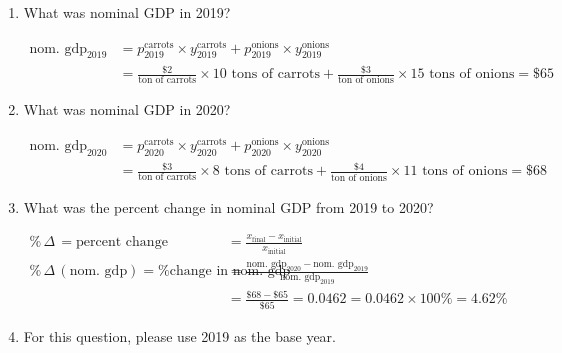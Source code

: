 \documentclass{assignment}
\begin{document}
\begin{enumerate}

\item What was nominal GDP in 2019?

\begin{solution}
\vspace{-1.0\baselineskip}
\begin{align*}
\text{nom.~gdp}_{\text{2019}} &= 
p^{\text{carrots}}_{\text{2019}} \times y^{\text{carrots}}_{\text{2019}} +
p^{\text{onions}}_{\text{2019}} \times y^{\text{onions}}_{\text{2019}} \\
 &= \frac{\$2}{\text{ton of carrots}} \times 10 \text{ tons of carrots} + \frac{\$3}{\text{ton of onions}} \times 15 \text{ tons of onions} = \$65
\end{align*}
\end{solution}

\item What was nominal GDP in 2020?

\begin{solution}
\vspace{-1.0\baselineskip}
\begin{align*}
\text{nom.~gdp}_{\text{2020}} &= 
p^{\text{carrots}}_{\text{2020}} \times y^{\text{carrots}}_{\text{2020}} +
p^{\text{onions}}_{\text{2020}} \times y^{\text{onions}}_{\text{2020}} \\
 &= \frac{\$3}{\text{ton of carrots}} \times 8 \text{ tons of carrots} + \frac{\$4}{\text{ton of onions}} \times 11 \text{ tons of onions} = \$68
\end{align*}
\end{solution}

\item What was the percent change in nominal GDP from 2019 to 2020?

\begin{solution}
\begin{align*}
\%\,\Delta\, = \text{percent change} &= \frac{ x_\text{final} - x_\text{initial} }{ x_\text{initial} } \\
\%\,\Delta\,(\text{nom.~gdp}) = \text{\% change in nom.~gdp} &= \frac{\text{nom. gdp}_{\text{2020}} - \text{nom. gdp}_{\text{2019}}}{\text{nom. gdp}_{\text{2019}}} \\
&= \frac{\$68 - \$65}{\$65} = 0.0462 = 0.0462 \times 100\% = 4.62\%
\end{align*}
\end{solution}

\item For this question, please use 2019 as the base year.


\end{enumerate}
\end{document}
